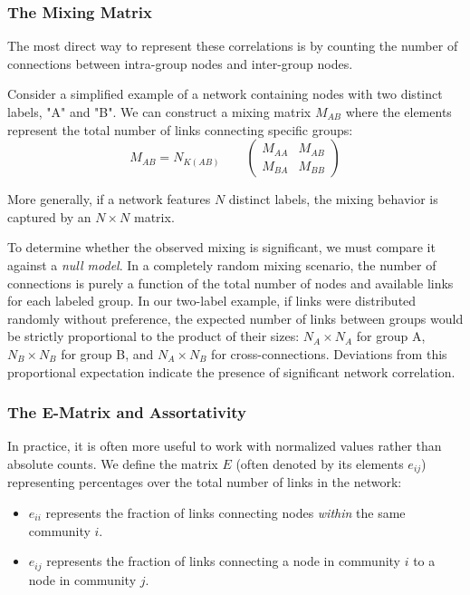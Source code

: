 \subsubsection{The Mixing Matrix}

The most direct way to represent these correlations is by counting the number of connections between intra-group nodes and inter-group nodes.

Consider a simplified example of a network containing nodes with two distinct labels, "A" and "B". We can construct a mixing matrix $M_{AB}$ where the elements represent the total number of links connecting specific groups:
$$M_{AB} = N_{K(AB)} \qquad \begin{pmatrix} M_{AA} & M_{AB} \\ M_{BA} & M_{BB} \end{pmatrix}$$

More generally, if a network features $N$ distinct labels, the mixing behavior is captured by an $N \times N$ matrix.

To determine whether the observed mixing is significant, we must compare it against a \textit{null model}. In a completely random mixing scenario, the number of connections is purely a function of the total number of nodes and available links for each labeled group. In our two-label example, if links were distributed randomly without preference, the expected number of links between groups would be strictly proportional to the product of their sizes: $N_A \times N_A$ for group A, $N_B \times N_B$ for group B, and $N_A \times N_B$ for cross-connections. Deviations from this proportional expectation indicate the presence of significant network correlation.

\subsubsection{The E-Matrix and Assortativity}

In practice, it is often more useful to work with normalized values rather than absolute counts. We define the matrix $E$ (often denoted by its elements $e_{ij}$) representing percentages over the total number of links in the network:
\begin{itemize}
    \item $e_{ii}$ represents the fraction of links connecting nodes \textit{within} the same community $i$.
    \item $e_{ij}$ represents the fraction of links connecting a node in community $i$ to a node in community $j$.
\end{itemize}

